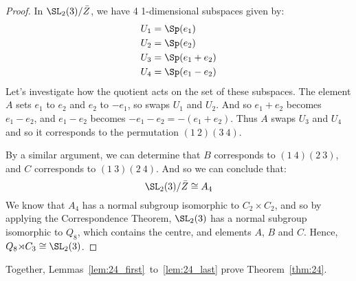 \begin{proof}
    In \(\SL_2(3)/\bar{Z}\), we have 4 1-dimensional subspaces given by:
    \begin{align*}
        U_1 &= \Sp(e_1) \\
        U_2 &= \Sp(e_2) \\
        U_3 &= \Sp(e_1 + e_2) \\
        U_4 &= \Sp(e_1 - e_2)
    \end{align*}
    Let's investigate how the quotient acts on the set of these subspaces.
    The element \(A\) sets \(e_1\) to \(e_2\) and \(e_2\) to \(-e_1\), so swaps \(U_1\) and \(U_2\).
    And so \(e_1 + e_2\) becomes \(e_1 - e_2\), and \(e_1 - e_2\) becomes \(-e_1 - e_2 = -(e_1 + e_2)\).
    Thus \(A\) swaps \(U_{3}\) and \(U_4\) and so it corresponds to the permutation \((1\ 2)(3\ 4)\).

    By a similar argument, we can determine that \(B\) corresponds to \((1\ 4)(2\ 3)\), and \(C\) corresponds to
    \((1\ 3)(2\ 4)\).
    And so we can conclude that:
    \[\SL_2(3)/\bar{Z} \cong A_4\]
    We know that \(A_4\) has a normal subgroup isomorphic to \(C_2 {\times} C_{2}\), and so by applying the
    Correspondence Theorem, \(\SL_2(3)\) has a normal subgroup isomorphic to \(Q_8\), which contains the centre, and
    elements \(A\), \(B\) and \(C\).
    Hence, \(Q_8 {\rtimes} C_3 \cong \SL_2(3)\).
\end{proof}

Together, Lemmas~\ref{lem:24_first}~to~\ref{lem:24_last} prove Theorem~\ref{thm:24}.

